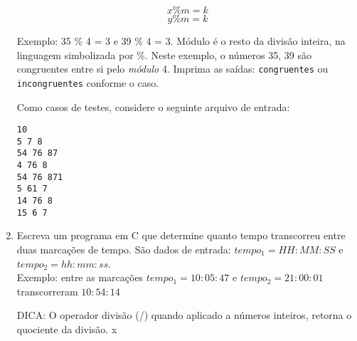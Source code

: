 \documentclass[12pt]{article}
\begin{document}
\begin{enumerate}
$$ x \% m = k$$
$$ y \% m = k$$
 
 Exemplo: 35 \% 4 = 3  e   39 \% 4 = 3. Módulo é o resto da divisão inteira, na linguagem 
 simbolizada por \%. Neste exemplo, o números 35, 39 são congruentes entre si
 pelo \textit{módulo} 4. Imprima as saídas: \texttt{congruentes} ou \texttt{incongruentes} conforme o caso.

Como  casos de testes, considere o seguinte arquivo de entrada:
\begin{verbatim}
10
5 7 8
54 76 87
4 76 8
54 76 871
5 61 7
14 76 8
15 6 7
\end{verbatim}




\item Escreva um programa em C que determine quanto tempo transcorreu entre duas marcações de tempo. São dados de entrada: $tempo_1 = HH:MM:SS$ e $tempo_2 = hh:mm:ss$. 
\\Exemplo: entre as marcações $tempo_1 = 10:05:47$ e $tempo_2 = 21:00:01$ transcorreram $10:54:14$

{\footnotesize DICA: O operador divisão (/) quando aplicado a números inteiros, retorna o quociente da divisão.}
x
\end{enumerate}
\end{document}
